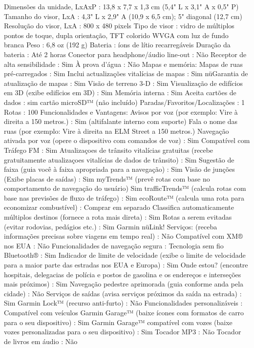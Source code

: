 Dimensões da unidade, LxAxP : 13,8 x 7,7 x 1,3 cm (5,4" L x 3,1" A x 0,5" P)
Tamanho do visor, LxA : 4,3" L x 2,9" A (10,9 x 6,5 cm); 5" diagonal (12,7 cm)
Resolução do visor, LxA : 800 x 480 pixels
Tipo de visor : vidro de múltiplos pontos de toque, dupla orientação, TFT colorido WVGA com luz de fundo branca
Peso : 6,8 oz (192 g)
Bateria : íons de lítio recarregáveis
Duração da bateria : Até 2 horas
Conector para headphone/áudio line-out : Não
Receptor de alta sensibilidade : Sim
À prova d'água : Não
Mapas e memória:
Mapas de ruas pré-carregados : Sim
Inclui actualizações vitalícias de mapas : Sim
nüGarantia de atualização de mapas : Sim
Visão de terreno 3-D : Sim
Visualização de edifícios em 3D (exibe edifícios em 3D) : Sim
Memória interna : Sim
Aceita cartões de dados : sim cartão microSD™ (não incluído)
Paradas/Favoritos/Localizações : 1
Rotas : 100
Funcionalidades e Vantagens:
Avisos por voz (por exemplo: Vire à direita a 150 metros.) : Sim (altifalante interno com suporte)
Fala o nome das ruas (por exemplo: Vire à direita na ELM Street a 150 metros.)
Navegação ativada por voz (opere o dispositivo com comandos de voz) : Sim
Compatível com Tráfego FM : Sim
Atualizaçoes de trânsito vitalícias gratuitas (recebe gratuitamente atualizaçoes vitalícias de dados de trânsito) : Sim
Sugestão de faixa (guia você à faixa apropriada para a navegação) : Sim
Visão de junções (Exibe placas de saídas) : Sim
myTrends™ (prevê rotas com base no comportamento de navegação do usuário) Sim
trafficTrends™ (calcula rotas com base nas previsões de fluxo de tráfego) : Sim
ecoRoute™ (calcula uma rota para economizar combustível) : Comprar em separado
Classifica automaticamente múltiplos destinos (fornece a rota mais direta) : Sim
Rotas a serem evitadas (evitar rodovias, pedágios etc.) : Sim
Garmin nüLink! Serviços: (receba informações precisas sobre viagens em tempo real) : Não
Compatível com XM® nos EUA : Não
Funcionalidades de navegação segura :
Tecnologia sem fio Bluetooth® : Sim
Indicador de limite de velocidade (exibe o limite de velocidade para a maior parte das estradas nos EUA e Europa) : Sim
Onde estou? (encontre hospitais, delegacias de polícia e postos de gasolina e os endereços e interseções mais próximos) : Sim
Navegação pedestre aprimorada (guia conforme anda pela cidade) : Não
Serviços de saídas (avisa serviços próximos da saída na estrada) : Sim
Garmin Lock™ (recurso anti-furto) : Não
Funcionalidades personalizáveis :
Compatível com veículos Garmin Garage™ (baixe ícones com formatos de carro para o seu dispositivo) : Sim
Garmin Garage™ compatível com vozes (baixe vozes personalizadas para o seu dispositivo) : Sim
Tocador MP3 : Não
Tocador de livros em áudio : Não



